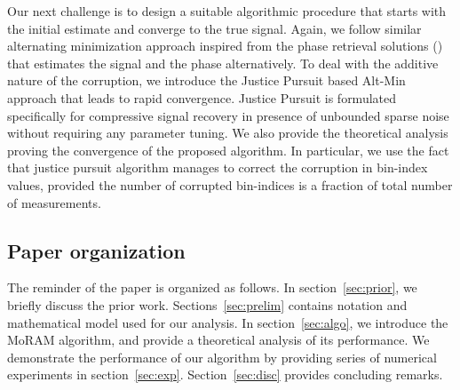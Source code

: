 Our next challenge is to design a suitable algorithmic procedure that starts with the initial estimate and converge to the true signal. Again, we follow similar alternating minimization approach inspired from the phase retrieval solutions (\cite{Netrapalli2013}) that estimates the signal and the phase alternatively. To deal with the additive nature of the corruption, we introduce the Justice Pursuit based Alt-Min approach that leads to rapid convergence. Justice Pursuit is formulated specifically for compressive signal recovery in presence of unbounded sparse noise without requiring any parameter tuning. We also provide the theoretical analysis proving the convergence of the proposed algorithm. In particular,  we use the fact that justice pursuit algorithm manages to correct the corruption in bin-index values, provided the number of corrupted bin-indices is a fraction of total number of measurements. 

\subsection{Paper organization} 
The reminder of the paper is organized as follows. In section~\ref{sec:prior}, we briefly discuss the prior work. Sections~\ref{sec:prelim} contains notation and mathematical model used for our analysis. In section~\ref{sec:algo}, we introduce the MoRAM algorithm, and provide a theoretical analysis of its performance. We demonstrate the performance of our algorithm by providing series of numerical experiments in section~\ref{sec:exp}. Section~\ref{sec:disc} provides concluding remarks.